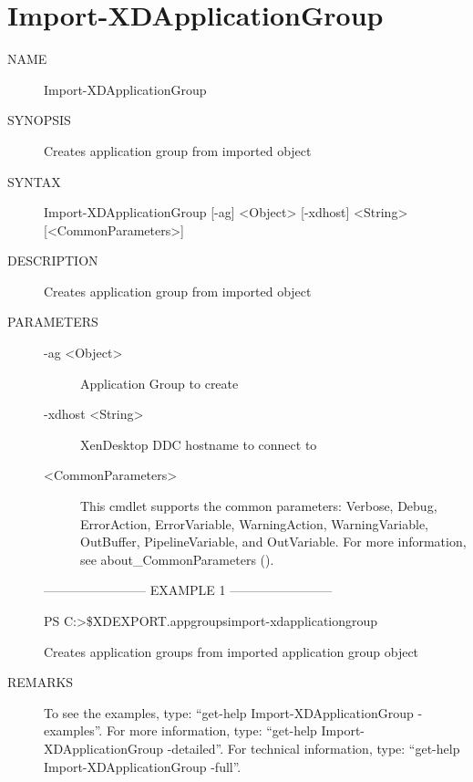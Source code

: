 \documentclass[letterpaper,10pt,english]{sphinxmanual}
\begin{document}
\section{Import-XDApplicationGroup}
\label{\detokenize{cmd_import:import-xdapplicationgroup}}\begin{description}
\item[{NAME}] \leavevmode
Import-XDApplicationGroup

\item[{SYNOPSIS}] \leavevmode
Creates application group from imported object

\item[{SYNTAX}] \leavevmode
Import-XDApplicationGroup {[}-ag{]} \textless{}Object\textgreater{} {[}-xdhost{]} \textless{}String\textgreater{} {[}\textless{}CommonParameters\textgreater{}{]}

\item[{DESCRIPTION}] \leavevmode
Creates application group from imported object

\item[{PARAMETERS}] \leavevmode\begin{description}
\item[{-ag \textless{}Object\textgreater{}}] \leavevmode
Application Group to create

\item[{-xdhost \textless{}String\textgreater{}}] \leavevmode
XenDesktop DDC hostname to connect to

\item[{\textless{}CommonParameters\textgreater{}}] \leavevmode
This cmdlet supports the common parameters: Verbose, Debug,
ErrorAction, ErrorVariable, WarningAction, WarningVariable,
OutBuffer, PipelineVariable, and OutVariable. For more information, see
about\_CommonParameters ().

\end{description}

————————\textendash{} EXAMPLE 1 ————————\textendash{}

PS C:\textgreater{}\$XDEXPORT.appgroups\textbar{}import-xdapplicationgroup

Creates application groups from imported application group object

\item[{REMARKS}] \leavevmode
To see the examples, type: “get-help Import-XDApplicationGroup -examples”.
For more information, type: “get-help Import-XDApplicationGroup -detailed”.
For technical information, type: “get-help Import-XDApplicationGroup -full”.

\end{description}
\end{document}
